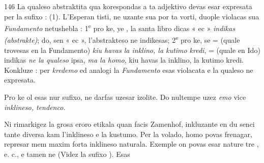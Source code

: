 \begin{VUpage}[150]{146}
La qualeso abstraktita qua korespondas a ta adjektivo\nl
devas esar expresata per la sufixo  : \cc
{} (1). L'Esperan\cc
tisti, ne uzante sua  por ta vorti, duople violacas sua\nl
\textit{Fundamento} netushebla : 1\textsuperscript{e} pro ke, ye , la santa libro\nl
dicas « ec » \textit{indikas (abstrakte)}; do, sen « ec », l'abstrakteso\nl
ne indikesas; 2\textsuperscript{e} pro ke, se  = (quale trovesas en la\nl
Fundamento) \textit{kiu havas la inklino, la kutimo kredi}, \nl
= (quale en Ido) indikas \textit{ne la qualeso} ipsa, \textit{ma la homo}, kiu\nl
havas la inklino, la kutimo kredi. Konkluze : per \textit{kredemo}\nl
ed analogi la \textit{Fundamento} esas violacata e la qualeso ne\nl
expresata.

Pro ke ol esas nur sufixo,  ne darfas uzesar izolite.\nl
Do nultempe uzez \textit{emo} vice \textit{inklineso, tendenco.}

Ni rimarkigez la grosa eroro etikala quan facis Zamenhof,\nl
inkluzante en  du senci tante diversa kam l'inklineso\nl
e la kustumo. Per la volado, homo povas frenagar, represar\nl
mem maxim forta inklineso naturala. Exemple on povas\nl
esar nature tre , e. c., e tamen\nl
ne  (Videz la sufixo ). Esas
\end{VUpage}

